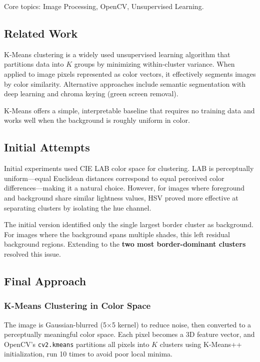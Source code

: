 \documentclass[conference,twocolumn]{IEEEtran}
\begin{document}
Core topics: Image Processing, OpenCV, Unsupervised Learning.

\subsection{Related Work}

K-Means clustering is a widely used unsupervised learning algorithm that partitions data into $K$ groups by minimizing within-cluster variance. When applied to image pixels represented as color vectors, it effectively segments images by color similarity. Alternative approaches include semantic segmentation with deep learning and chroma keying (green screen removal).

K-Means offers a simple, interpretable baseline that requires no training data and works well when the background is roughly uniform in color.

\subsection{Initial Attempts}

Initial experiments used CIE LAB color space for clustering. LAB is perceptually uniform—equal Euclidean distances correspond to equal perceived color differences—making it a natural choice. However, for images where foreground and background share similar lightness values, HSV proved more effective at separating clusters by isolating the hue channel.

The initial version identified only the single largest border cluster as background. For images where the background spans multiple shades, this left residual background regions. Extending to the \textbf{two most border-dominant clusters} resolved this issue.

\subsection{Final Approach}

\subsubsection{K-Means Clustering in Color Space}

The image is Gaussian-blurred (5$\times$5 kernel) to reduce noise, then converted to a perceptually meaningful color space. Each pixel becomes a 3D feature vector, and OpenCV's \texttt{cv2.kmeans} partitions all pixels into $K$ clusters using K-Means++ initialization, run 10 times to avoid poor local minima.
\end{document}

